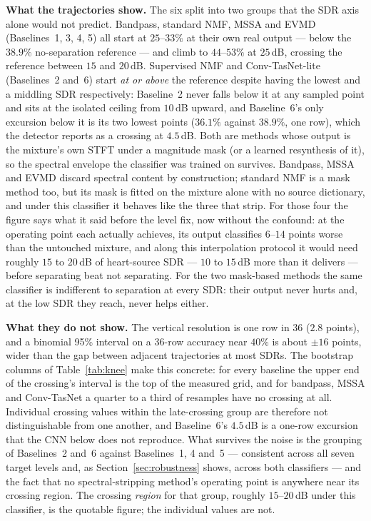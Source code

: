 \documentclass[11pt]{article}
\begin{document}
\textbf{What the trajectories show.} The six split into two groups that
the SDR axis alone would not predict. Bandpass, standard NMF, MSSA and
EVMD (Baselines~1, 3, 4, 5) all start at $25$--$33\%$ at their own real
output --- below the $38.9\%$ no-separation reference --- and climb to
$44$--$53\%$ at $25$\,dB, crossing the reference between $15$ and
$20$\,dB. Supervised NMF and Conv-TasNet-lite (Baselines~2 and~6) start
\emph{at or above} the reference despite having the lowest and a
middling SDR respectively: Baseline~2 never falls below it at any sampled
point and sits at the isolated ceiling from $10$\,dB upward, and
Baseline~6's only excursion below it is its two lowest points ($36.1\%$
against $38.9\%$, one row), which the detector reports as a crossing at
$4.5$\,dB. Both are methods whose output is the mixture's own STFT under
a magnitude mask (or a learned resynthesis of it), so the spectral
envelope the classifier was trained on survives. Bandpass, MSSA and EVMD
discard spectral content by construction; standard NMF is a mask method
too, but its mask is fitted on the mixture alone with no source
dictionary, and under this classifier it behaves like the three that
strip. For those four the figure says what it said before the level fix,
now without the confound: at the operating point each actually achieves,
its output classifies $6$--$14$ points worse than the untouched mixture,
and along this interpolation protocol it would need roughly $15$ to
$20$\,dB of heart-source SDR --- $10$ to $15$\,dB more than it delivers
--- before separating beat not separating. For the two mask-based methods
the same classifier is indifferent to separation at every SDR: their
output never hurts and, at the low SDR they reach, never helps either.

\textbf{What they do not show.} The vertical resolution is one row in 36
($2.8$ points), and a binomial 95\% interval on a 36-row accuracy near
$40\%$ is about $\pm16$ points, wider than the gap between adjacent
trajectories at most SDRs. The bootstrap columns of Table~\ref{tab:knee}
make this concrete: for every baseline the upper end of the crossing's
interval is the top of the measured grid, and for bandpass, MSSA and
Conv-TasNet a quarter to a third of resamples have no crossing at all.
Individual crossing values within the late-crossing group are therefore
not distinguishable from one another, and Baseline~6's $4.5$\,dB is a
one-row excursion that the CNN below does not reproduce. What survives
the noise is the grouping of Baselines~2 and~6 against Baselines~1, 4
and~5 --- consistent across all seven target levels and, as
Section~\ref{sec:robustness} shows, across both classifiers --- and the
fact that no spectral-stripping method's operating point is anywhere
near its crossing region. The crossing \emph{region} for that group,
roughly $15$--$20$\,dB under this classifier, is the quotable figure; the
individual values are not.
\end{document}
